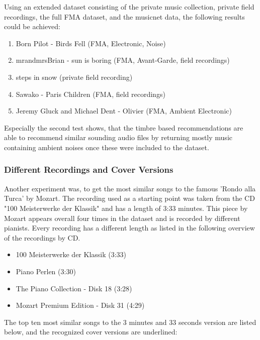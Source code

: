 \noindent Using an extended dataset consisting of the private music collection, private field recordings, the full FMA dataset, and the musicnet data, the following results could be achieved: 

\begin{enumerate}
	\setlength\itemsep{-0.5em}
	\item Born Pilot - Birds Fell (FMA, Electronic, Noise)
	\item mrandmrsBrian - sun is boring (FMA, Avant-Garde, field recordings)
	\item steps in snow (private field recording)
	\item Sawako - Paris Children (FMA, field recordings)
	\item Jeremy Gluck and Michael Dent - Olivier (FMA, Ambient Electronic)
\end{enumerate}

\noindent Especially the second test shows, that the timbre based recommendations are able to recommend similar sounding audio files by returning mostly music containing ambient noises once these were included to the dataset.

\subsubsection{Different Recordings and Cover Versions}\label{covermfcc}
Another experiment was, to get the most similar songs to the famous 'Rondo alla Turca' by Mozart.
The recording used as a starting point was taken from the CD "100 Meisterwerke der Klassik" and has a length of 3:33 minutes. This piece by Mozart appears overall four times in the dataset and is recorded by different pianists.
Every recording has a different length as listed in the following overview of the recordings by CD.

\begin{itemize}
	\setlength\itemsep{-0.5em}
	\item 100 Meisterwerke der Klassik (3:33)
	\item Piano Perlen (3:30)
	\item The Piano Collection - Disk 18 (3:28)
	\item Mozart Premium Edition - Disk 31 (4:29)
	
\end{itemize}

\noindent The top ten most similar songs to the 3 minutes and 33 seconds version are listed below, and the recognized cover versions are underlined:

